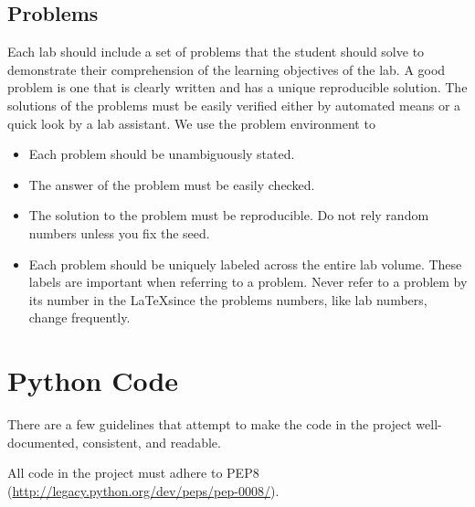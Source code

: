 \subsection{Problems}
Each lab should include a set of problems that the student should solve to demonstrate their comprehension of the learning objectives of the lab.
A good problem is one that is clearly written and has a unique reproducible solution.
The solutions of the problems must be easily verified either by automated means or a quick look by a lab assistant.
We use the problem environment to 
\begin{itemize}
\item Each problem should be unambiguously stated.
\item The answer of the problem must be easily checked.
\item The solution to the problem must be reproducible.
Do not rely random numbers unless you fix the seed.
\item Each problem should be uniquely labeled across the entire lab volume.
These labels are important when referring to a problem.
Never refer to a problem by its number in the \LaTeX since the problems numbers, like lab numbers, change frequently.
\end{itemize}

\section{Python Code}
There are a few guidelines that attempt to make the code in the project well-documented, consistent, and readable.

All code in the project must adhere to PEP8 (\url{http://legacy.python.org/dev/peps/pep-0008/}).

